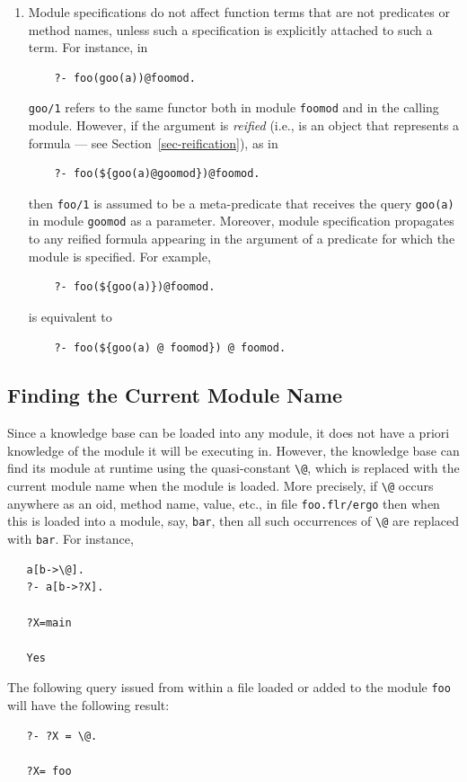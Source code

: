 \documentclass[11pt]{article}
\makeatletter
\newcommand{\ERGO}{\mbox{\smaller{\ensuremath{\cal{E}}\smaller{{\sc{RGO}}}}}\xspace}
\newcommand{\FLSYSTEM}{\ERGO}
\newcommand{\flrext}{flr\xspace}
\newcommand{\ergoext}{ergo\xspace}
\newcommand{\thismodule}{{\tt \bs{}@}\xspace}
\newcommand{\bs}{\textbackslash}
\makeatother
\begin{document}
\begin{enumerate}
\item Module specifications do not affect function terms that are not
  predicates or method names, unless such a specification is explicitly
  attached to such a term. For instance, in
  \begin{verbatim}
    ?- foo(goo(a))@foomod.
  \end{verbatim}
  {\tt goo/1} refers to the same functor both in module {\tt foomod} and in
  the calling module. However, if the argument is \emph{reified} (i.e., is
  an object that represents a formula --- see
  Section~\ref{sec-reification}), as in
  \begin{verbatim}
    ?- foo(${goo(a)@goomod})@foomod.
  \end{verbatim}
  then {\tt foo/1} is assumed to be a meta-predicate that receives the
  query {\tt goo(a)} in module {\tt goomod} as a parameter. Moreover,
  module specification propagates to any reified formula appearing in
  the argument of a predicate for which the module is specified. For example,
  \begin{verbatim}
    ?- foo(${goo(a)})@foomod.
  \end{verbatim}
is equivalent to
  \begin{verbatim}
    ?- foo(${goo(a) @ foomod}) @ foomod.
  \end{verbatim}

\end{enumerate}


\subsection{Finding the Current Module Name}\label{sec-currmod}

\index{module!\thismodule}
\index{\thismodule}
%
Since a \FLSYSTEM knowledge base can be loaded into any module, it does not
have a priori knowledge of the module it will be executing in. However, the
knowledge base can find its module at runtime using the quasi-constant
\thismodule, which is replaced with the current module name when the module
is loaded. More precisely, if \thismodule occurs anywhere as an oid, method
name, value, etc., in file {\tt foo.\flrext/\ergoext} then when this is loaded
into a module, say, {\tt bar}, then all such occurrences of \thismodule are
replaced with {\tt bar}. For instance,
\begin{verbatim}
   a[b->\@].
   ?- a[b->?X].

   ?X=main

   Yes
\end{verbatim}
The following query issued from within a file loaded or added to
the module \texttt{foo} will have
the following result:
\begin{verbatim}
   ?- ?X = \@.

   ?X= foo
\end{verbatim}
\end{document}
